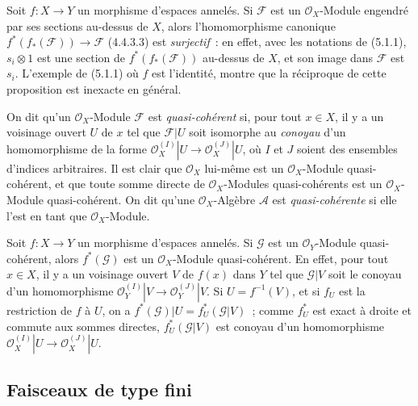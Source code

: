 \begin{env}[5.1.2]
\label{0.5.1.2-fr}
Soit $f:X\to Y$ un morphisme d'espaces annelés. Si $\mathcal{F}$ est un
$\mathcal{O}_X$-Module engendré par ses sections au-dessus de $X$, alors
l'homomorphisme canonique
$f^*(f_*(\mathcal{F}))\to\mathcal{F}$ (4.4.3.3) est \emph{surjectif}~: en
effet, avec les notations de (5.1.1), $s_i\otimes1$ est une section de
$f^*(f_*(\mathcal{F}))$ au-dessus de $X$, et son image dans $\mathcal{F}$ est
$s_i$. L'exemple de (5.1.1) où $f$ est l'identité, montre que la réciproque de
cette proposition est inexacte en général.
\end{env}

\begin{env}[5.1.3]
\label{0.5.1.3-fr}
On dit qu'un $\mathcal{O}_X$-Module $\mathcal{F}$ est \emph{quasi-cohérent}
si, pour tout $x\in X$, il y a un voisinage ouvert $U$ de $x$ tel que
$\mathcal{F}|U$ soit isomorphe au \emph{conoyau} d'un homomorphisme de la
forme
$\mathcal{O}_X^{(I)}|U\to\mathcal{O}_X^{(J)}|U$, où $I$ et $J$ soient des
ensembles d'indices arbitraires. Il est clair que $\mathcal{O}_X$ lui-même est
un $\mathcal{O}_X$-Module quasi-cohérent, et que toute somme directe de
$\mathcal{O}_X$-Modules quasi-cohérents est un $\mathcal{O}_X$-Module
quasi-cohérent. On dit qu'une $\mathcal{O}_X$-Algèbre $\mathcal{A}$ est
\emph{quasi-cohérente} si elle l'est en tant que $\mathcal{O}_X$-Module.
\end{env}

\begin{env}[5.1.4]
\label{0.5.1.4-fr}
Soit $f:X\to Y$ un morphisme d'espaces annelés. Si $\mathcal{G}$ est un
$\mathcal{O}_Y$-Module quasi-cohérent, alors $f^*(\mathcal{G})$ est un
$\mathcal{O}_X$-Module quasi-cohérent. En effet, pour tout $x\in X$, il y a
un voisinage ouvert $V$ de $f(x)$ dans $Y$ tel que $\mathcal{G}|V$ soit le
conoyau d'un homomorphisme
$\mathcal{O}_Y^{(I)}|V\to\mathcal{O}_Y^{(J)}|V$. Si $U=f^{-1}(V)$, et si
$f_U$ est la restriction de $f$ à $U$, on a
$f^*(\mathcal{G})|U=f_U^*(\mathcal{G}|V)$~; comme $f_U^*$ est exact à droite
et commute aux sommes directes, $f_U^*(\mathcal{G}|V)$ est conoyau d'un
homomorphisme
$\mathcal{O}_X^{(I)}|U\to\mathcal{O}_X^{(J)}|U$.
\end{env}

\subsection{Faisceaux de type fini}
\label{subsection:0.5.2-fr}

